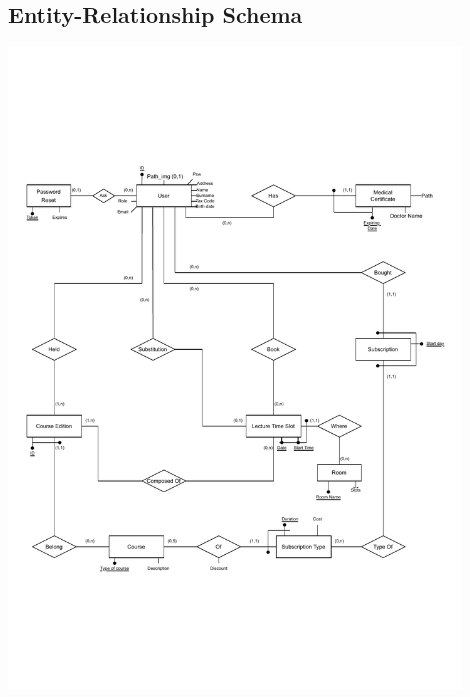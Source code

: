 \subsection{Entity-Relationship Schema}
    \begin{center}
        \includegraphics[width=0.9\textwidth]{resources/ER_restructured.pdf}
    \end{center}

